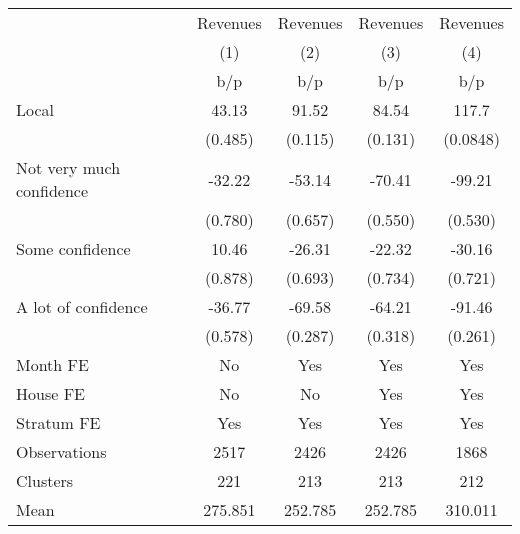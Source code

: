 {
\def\sym#1{\ifmmode^{#1}\else\(^{#1}\)\fi}
\begin{tabular}{l*{4}{c}}
\toprule
                &\multicolumn{1}{c}{Revenues}&\multicolumn{1}{c}{Revenues}&\multicolumn{1}{c}{Revenues}&\multicolumn{1}{c}{Revenues}\\
                &\multicolumn{1}{c}{(1)}&\multicolumn{1}{c}{(2)}&\multicolumn{1}{c}{(3)}&\multicolumn{1}{c}{(4)}\\
                &      b/p&      b/p&      b/p&      b/p\\
\midrule
Local           &    43.13&    91.52&    84.54&    117.7\\
                &  (0.485)&  (0.115)&  (0.131)& (0.0848)\\
Not very much confidence&   -32.22&   -53.14&   -70.41&   -99.21\\
                &  (0.780)&  (0.657)&  (0.550)&  (0.530)\\
Some confidence &    10.46&   -26.31&   -22.32&   -30.16\\
                &  (0.878)&  (0.693)&  (0.734)&  (0.721)\\
A lot of confidence&   -36.77&   -69.58&   -64.21&   -91.46\\
                &  (0.578)&  (0.287)&  (0.318)&  (0.261)\\
Month FE        &       No&      Yes&      Yes&      Yes\\
House FE        &       No&       No&      Yes&      Yes\\
Stratum FE      &      Yes&      Yes&      Yes&      Yes\\
\midrule
Observations    &     2517&     2426&     2426&     1868\\
Clusters        &      221&      213&      213&      212\\
Mean            &  275.851&  252.785&  252.785&  310.011\\
\bottomrule
\end{tabular}
}
